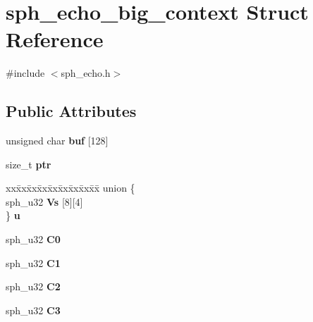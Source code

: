 \hypertarget{structsph__echo__big__context}{}\section{sph\+\_\+echo\+\_\+big\+\_\+context Struct Reference}
\label{structsph__echo__big__context}


{\ttfamily \#include $<$sph\+\_\+echo.\+h$>$}

\subsection*{Public Attributes}
\begin{DoxyCompactItemize}
\item 
\mbox{\label{structsph__echo__big__context_afbbb9735887ec344ebbf08794fb2ab88}} 
unsigned char {\bfseries buf} \mbox{[}128\mbox{]}
\item 
\mbox{\label{structsph__echo__big__context_a6fdc1eb8dd708859a33005694d4f7bea}} 
size\+\_\+t {\bfseries ptr}
\item 
\mbox{\label{structsph__echo__big__context_ac7a92ae6c99561e741b06bb7c8249650}} 
\begin{tabbing}
xx\=xx\=xx\=xx\=xx\=xx\=xx\=xx\=xx\=\kill
union \{\\
\>sph\_u32 {\bfseries Vs} \mbox{[}8\mbox{]}\mbox{[}4\mbox{]}\\
\} {\bfseries u}\\

\end{tabbing}\item 
\mbox{\label{structsph__echo__big__context_a09f8372745d87b7dbd3539537c0ffbe6}} 
sph\+\_\+u32 {\bfseries C0}
\item 
\mbox{\label{structsph__echo__big__context_a67491384a26e2b2b255acbf5c0d31dea}} 
sph\+\_\+u32 {\bfseries C1}
\item 
\mbox{\label{structsph__echo__big__context_a23512c6f7c858b9fa14d266b230a0397}} 
sph\+\_\+u32 {\bfseries C2}
\item 
\mbox{\label{structsph__echo__big__context_ab35268b438f8a2aeb96a48ecbc055b81}} 
sph\+\_\+u32 {\bfseries C3}
\end{DoxyCompactItemize}



